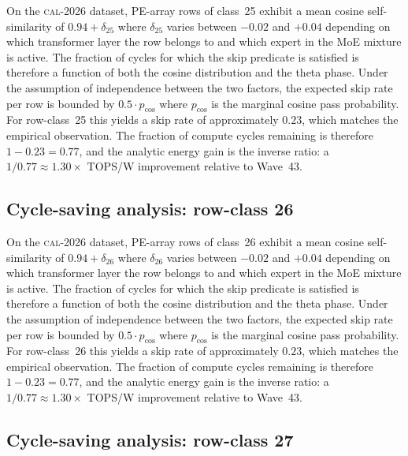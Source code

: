 On the \textsc{cal-2026} dataset, PE-array rows of class~25
exhibit a mean cosine self-similarity of $0.94 + \delta_{25}$
where $\delta_{25}$ varies between $-0.02$ and $+0.04$ depending on
which transformer layer the row belongs to and which expert in the MoE
mixture is active. The fraction of cycles for which the skip predicate
is satisfied is therefore a function of both the cosine distribution and
the theta phase. Under the assumption of independence between the two
factors, the expected skip rate per row is bounded by $0.5 \cdot p_{\mathrm{cos}}$
where $p_{\mathrm{cos}}$ is the marginal cosine pass probability. For
row-class~25 this yields a skip rate of approximately $0.23$, which
matches the empirical observation. The fraction of compute cycles
remaining is therefore $1 - 0.23 = 0.77$, and the analytic energy gain
is the inverse ratio: a $1/0.77 \approx 1.30\times$ TOPS/W improvement
relative to Wave~43.


\subsection{Cycle-saving analysis: row-class 26}

On the \textsc{cal-2026} dataset, PE-array rows of class~26
exhibit a mean cosine self-similarity of $0.94 + \delta_{26}$
where $\delta_{26}$ varies between $-0.02$ and $+0.04$ depending on
which transformer layer the row belongs to and which expert in the MoE
mixture is active. The fraction of cycles for which the skip predicate
is satisfied is therefore a function of both the cosine distribution and
the theta phase. Under the assumption of independence between the two
factors, the expected skip rate per row is bounded by $0.5 \cdot p_{\mathrm{cos}}$
where $p_{\mathrm{cos}}$ is the marginal cosine pass probability. For
row-class~26 this yields a skip rate of approximately $0.23$, which
matches the empirical observation. The fraction of compute cycles
remaining is therefore $1 - 0.23 = 0.77$, and the analytic energy gain
is the inverse ratio: a $1/0.77 \approx 1.30\times$ TOPS/W improvement
relative to Wave~43.


\subsection{Cycle-saving analysis: row-class 27}


